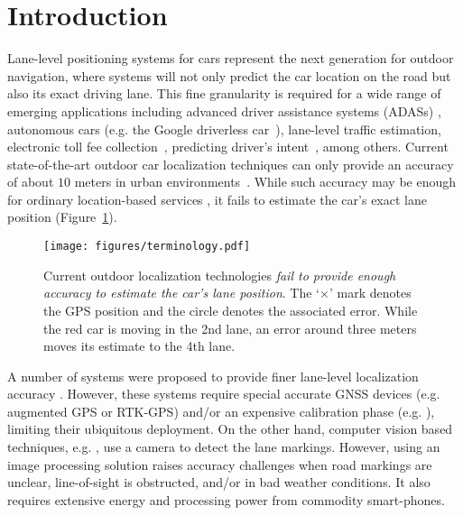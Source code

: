 \documentclass[10pt, conference, compsocconf]{IEEEtran}
\begin{document}
\section{Introduction}\label{sec:intro} Lane-level positioning systems for cars represent the next generation for outdoor navigation, where systems will not only predict the car location on the road but also its exact driving lane. This fine granularity is required for a wide range of emerging applications including advanced driver assistance systems (ADASs) \cite{hofmann2009quality}, autonomous cars (e.g. the Google driverless car~\cite{markoff2010google}), lane-level traffic estimation, electronic toll fee collection~\cite{de2011traffic}, predicting driver's intent~\cite{doshi2011tactical}, among others.  Current state-of-the-art outdoor car localization techniques can only provide an accuracy of about $10$ meters in urban environments~\cite{aly2013dejavu}. While such accuracy may be enough for ordinary location-based services \cite{ye2010location,aly_map14}, it fails to estimate the car's exact lane position (Figure~\ref{fig:loc_error}).

\begin{figure}[!t]
\centering
\texttt{[image: figures/terminology.pdf]}
\caption{Current outdoor localization technologies \emph{fail to provide enough accuracy to estimate the car's lane position}. The `$\times$' mark denotes the GPS position and the circle denotes the associated error. While the red car is moving in the 2nd lane, an error around three meters moves its estimate to the 4th lane.}
\label{fig:loc_error}
\end{figure}
A number of systems were proposed to provide finer lane-level localization accuracy \cite{toledo2010lane,tao2013lane,ren2010lane}. However, these systems require special accurate GNSS devices (e.g. augmented GPS or RTK-GPS) and/or an expensive calibration phase (e.g. \cite{toledo2010lane,tao2013lane}), limiting their ubiquitous deployment. On the other hand, computer vision based techniques, e.g. \cite{ren2010lane}, use a camera to detect the lane markings. However, using an image processing solution raises accuracy challenges when road markings are unclear, line-of-sight is obstructed, and/or in bad weather conditions. It also requires extensive energy and processing power from commodity smart-phones.
\end{document}
